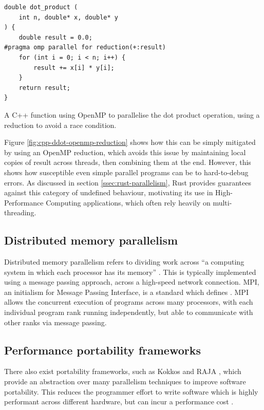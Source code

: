 \begin{listing}[H]
    \begin{verbatim}
double dot_product (
    int n, double* x, double* y
) {
    double result = 0.0;
#pragma omp parallel for reduction(+:result)
    for (int i = 0; i < n; i++) {
        result += x[i] * y[i];
    }
    return result;
}
    \end{verbatim}
    \caption{A C++ function using OpenMP to parallelise the dot product operation, using a reduction to avoid a race condition.}
    \label{fig:cpp-ddot-openmp-reduction}
\end{listing}

Figure \ref{fig:cpp-ddot-openmp-reduction} shows how this can be simply mitigated by using an OpenMP reduction, which avoids this issue by maintaining local copies of result across threads, then combining them at the end. However, this shows how susceptible even simple parallel programs can be to hard-to-debug errors. As discussed in section \ref{ssec:rust-parallelism}, Rust provides guarantees against this category of undefined behaviour, motivating its use in High-Performance Computing applications, which often rely heavily on multi-threading.

\subsection{Distributed memory parallelism}
\label{ssec:distributed-memory-paralellism}

Distributed memory parallelism refers to dividing work across ``a computing system in which each processor has its memory'' \cite{pardo2021modeling}. This is typically implemented using a message passing approach, across a high-speed network connection. MPI, an initialism for Message Passing Interface, is a standard which defines  \cite{thempiforumMPIMessagePassing1993}. MPI allows the concurrent execution of programs across many processors, with each individual program rank running independently, but able to communicate with other ranks via message passing.


\subsection{Performance portability frameworks}
\label{ssec:performance-portability-frameworks}

There also exist portability frameworks, such as Kokkos \cite{edwardsKokkosEnablingPerformance2013} and RAJA \cite{}, which provide an abstraction over many parallelism techniques to improve software portability. This reduces the programmer effort to write software which is highly performant across different hardware, but can incur a performance cost \cite{}.

